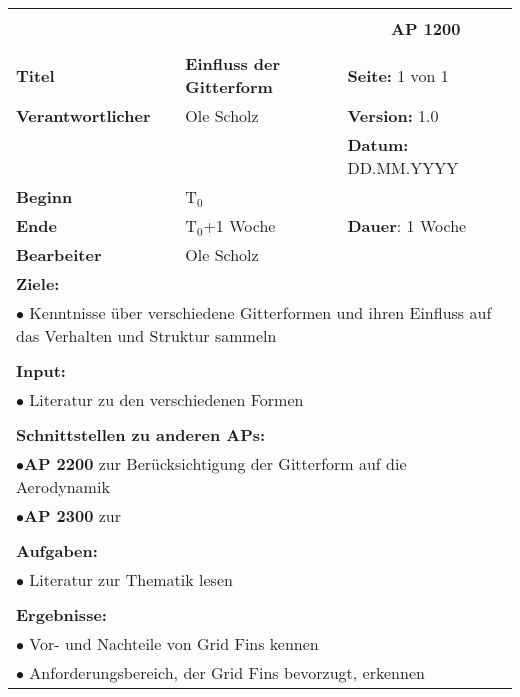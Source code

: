 \clearpage
\begin{table}[!h]
	\begin{center}
		\begin{tabular}{|p{35mm}||p{55mm}|p{50mm}||p{40mm}|}
			\hline
			\multicolumn{3}{|l||}{\textbf{}} & \multicolumn{1}{c|}{}\\
			\multicolumn{3}{|l||}{\textbf{}} & \multicolumn{1}{c|}{\textbf{AP 1200}}\\
			\multicolumn{3}{|l||}{\textbf{}} & \multicolumn{1}{c|}{}\\
			\hline\hline
			\textbf{Titel} & \multicolumn{2}{p{7cm}||}{\textbf{Einfluss der Gitterform}} 
			& \textbf{Seite:} 1 von 1\\
			\hline
			\textbf{Verantwortlicher} & \multicolumn{2}{l||}{Ole Scholz} & \textbf{Version:} 1.0\\
			\hline
			\multicolumn{3}{|l||}{} & \textbf{Datum:} DD.MM.YYYY\\
			\hline\hline
			\textbf{Beginn} & \multicolumn{2}{l||}{T$_0$} & \\
			\hline
			\textbf{Ende} & \multicolumn{2}{l||}{T$_0$+1 Woche} & \textbf{Dauer}: 1 Woche\\
			\hline\hline
			\textbf{Bearbeiter} & \multicolumn{3}{l|}{Ole Scholz}\\
			\hline\hline
			\multicolumn{4}{|p{150mm}|}{\textbf{Ziele:}}\\
			\multicolumn{4}{|p{150mm}|}{$\bullet$ Kenntnisse über verschiedene Gitterformen und ihren Einfluss auf das Verhalten und Struktur sammeln}\\
			\multicolumn{4}{|p{150mm}|}{}\\
			\multicolumn{4}{|p{150mm}|}{\textbf{Input:}}\\
			\multicolumn{4}{|p{150mm}|}{$\bullet$ Literatur zu den verschiedenen Formen}\\
			\multicolumn{4}{|p{150mm}|}{}\\
			\multicolumn{4}{|p{150mm}|}{\textbf{Schnittstellen zu anderen APs:}}\\
			\multicolumn{4}{|p{150mm}|}{$\bullet$\textbf{AP 2200} zur Berücksichtigung der Gitterform auf die Aerodynamik}\\
			\multicolumn{4}{|p{150mm}|}{$\bullet$\textbf{AP 2300} zur}\\
			\multicolumn{4}{|p{150mm}|}{}\\
			\multicolumn{4}{|p{150mm}|}{\textbf{Aufgaben:}}\\
			\multicolumn{4}{|p{150mm}|}{$\bullet$ Literatur zur Thematik lesen}\\
			\multicolumn{4}{|p{150mm}|}{}\\
			\multicolumn{4}{|p{150mm}|}{\textbf{Ergebnisse:}}\\
			\multicolumn{4}{|p{150mm}|}{$\bullet$ Vor- und Nachteile von Grid Fins kennen}\\
			\multicolumn{4}{|p{150mm}|}{$\bullet$ Anforderungsbereich, der Grid Fins bevorzugt, erkennen}\\
			\hline
		\end{tabular}
	\end{center}
\end{table}
	
